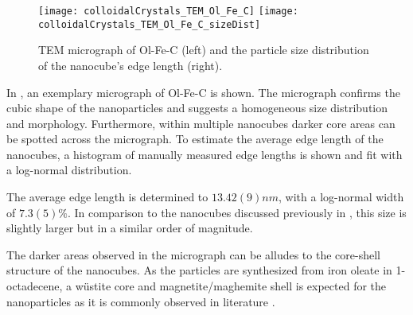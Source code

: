 \documentclass[\main/dresen_thesis.tex]{subfiles}
\begin{document}
  \label{sec:colloidalCrystals:nanoparticle:tem}
  \begin{figure}[!htbp]
    \centering
    \texttt{[image: colloidalCrystals\_TEM\_Ol\_Fe\_C]}
    \texttt{[image: colloidalCrystals\_TEM\_Ol\_Fe\_C\_sizeDist]}
    \caption{\label{fig:colloidalCrystals:nanoparticle:tem}TEM micrograph of Ol-Fe-C (left) and the particle size distribution of the nanocube's edge length (right).}
  \end{figure}

  In , an exemplary micrograph of Ol-Fe-C is shown.
  The micrograph confirms the cubic shape of the nanoparticles and suggests a homogeneous size distribution and morphology.
  Furthermore, within multiple nanocubes darker core areas can be spotted across the micrograph.
  To estimate the average edge length of the nanocubes, a histogram of manually measured edge lengths is shown and fit with a log-normal distribution.

  The average edge length is determined to $13.42(9) \unit{nm}$, with a log-normal width of $7.3(5) \unit{\%}$.
  In comparison to the nanocubes discussed previously in , this size is slightly larger but in a similar order of magnitude.

  The darker areas observed in the micrograph can be alludes to the core-shell structure of the nanocubes.
  As the particles are synthesized from iron oleate in 1-octadecene, a w\"ustite core and magnetite/maghemite shell is expected for the nanoparticles as it is commonly observed in literature \cite{Wetterskog_2013_Anoma}.
\end{document}
